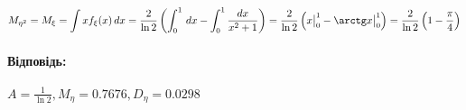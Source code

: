 \documentclass[a4paper, 12pt, oneside]{extarticle}
\newcommand{\Problem}{\subsection}
\newcommand{\Answer}[1]{
\medskip
\null\hfill
\begin{boxedminipage}{\textwidth}
	\paragraph{Відповідь: }{#1}
\end{boxedminipage}
}
\begin{document}
$$
M_{\eta^2} = M_\xi = \int x f_\xi(x)\,dx
= \frac{2}{\ln 2}
\left(
	\int_0^1\,dx - \int_0^1\frac{dx}{x^2+1}
\right)
= \frac{2}{\ln 2}
\left(
	x \big|_0^1 - \arctg x\big|_0^1
\right)
= \frac{2}{\ln 2}
\left(
	1 - \frac{\pi}{4}
\right)
$$

\Answer{
	$A = \frac{1}{\ln 2},
	M_\eta = 0.7676,
	D_\eta = 0.0298
	$
}


\end{document}
